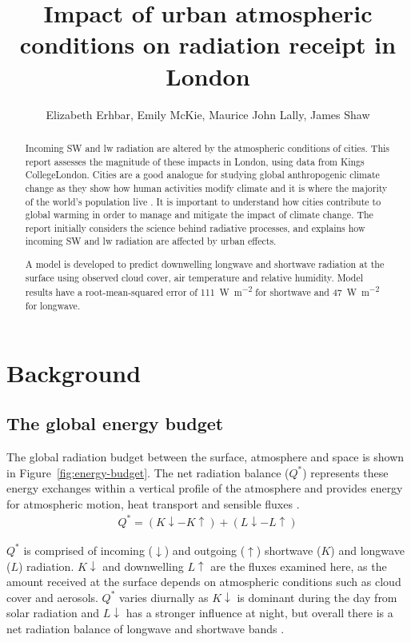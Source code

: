 \documentclass[a4paper,titlepage, twoside]{report}
\newcommand\Kdown{K\!\!\downarrow}
\newcommand\Kup{K\!\!\uparrow}
\newcommand\Ldown{L\!\!\downarrow}
\newcommand\Lup{L\!\!\uparrow}
\begin{document}
\expandafter\def\csname PY@tok@err\endcsname{}

\title{Impact of urban atmospheric conditions on radiation receipt in London}
\author{Elizabeth Erhbar, Emily McKie, Maurice John Lally, James Shaw}
\maketitle

\begin{abstract}
Incoming SW and lw radiation are altered by the atmospheric conditions of cities. This report assesses the magnitude of these impacts in London, using data from Kings CollegeLondon. Cities are a good analogue for studying global anthropogenic climate change as they show how human activities modify climate and it is where the majority of the world's population live \parencite{cleugh}. It is important to understand how cities contribute to global warming in order to manage and mitigate the impact of climate change. The report initially considers the science behind radiative processes, and explains how incoming SW and lw radiation are affected by urban effects.

A model is developed to predict downwelling longwave and shortwave radiation at the surface using observed cloud cover, air temperature and relative humidity.  Model results have a root-mean-squared error of \SI{111}{\watt\per\meter\squared} for shortwave and \SI{47}{\watt\per\meter\squared} for longwave.
\end{abstract}

\tableofcontents

\chapter{Background}
\section{The global energy budget}
The global radiation budget between the surface, atmosphere and space is shown in Figure~\ref{fig:energy-budget}.  The net radiation balance ($Q^\ast$) represents these energy exchanges within a vertical profile of the atmosphere and provides energy for atmospheric motion, heat transport and sensible fluxes \parencite{offerle}.
\begin{align}
Q^\ast = \left( \Kdown - \Kup \right) + \left( \Ldown - \Lup \right)
\end{align}

$Q^\ast$ is comprised of incoming ($\downarrow$) and outgoing ($\uparrow$) shortwave ($K$) and longwave ($L$) radiation. $\Kdown$ and downwelling $\Lup$ are the fluxes examined here, as the amount received at the surface depends on atmospheric conditions such as cloud cover and aerosols. $Q^\ast$ varies diurnally as $\Kdown$ is dominant during the day from solar radiation and $\Ldown$ has a stronger influence at night, but overall there is a net radiation balance of longwave and shortwave bands \parencite{oke}.
\end{document}
